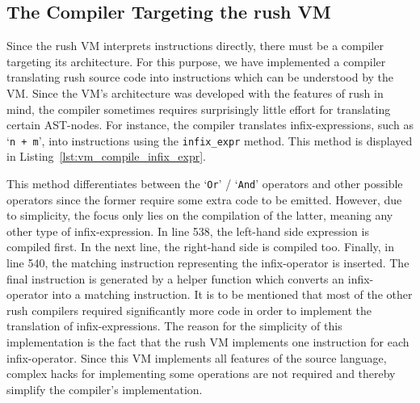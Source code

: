 \subsection{The Compiler Targeting the rush VM}

Since the rush VM interprets instructions directly, there must be a compiler targeting its architecture.
For this purpose, we have implemented a compiler translating rush source code into instructions which can be understood by the VM\@.
Since the VM's architecture was developed with the features of rush in mind,
the compiler sometimes requires surprisingly little effort for translating certain AST-nodes.
For instance, the compiler translates infix-expressions, such as `\texttt{n + m}', into instructions using the \texttt{infix\_expr} method.
This method is displayed in Listing~\ref{lst:vm_compile_infix_expr}.


This method differentiates between the `\texttt{Or}' / `\texttt{And}' operators and other possible operators since the former require some extra code to be emitted.
However, due to simplicity, the focus only lies on the compilation of the latter, meaning any other type of infix-expression.
In line 538, the left-hand side expression is compiled first.
In the next line, the right-hand side is compiled too.
Finally, in line 540, the matching instruction representing the infix-operator is inserted.
The final instruction is generated by a helper function which converts an infix-operator into a matching instruction.
It is to be mentioned that most of the other rush compilers required significantly more code in order to implement the translation of infix-expressions.
The reason for the simplicity of this implementation is the fact that the rush VM implements one instruction for each infix-operator.
Since this VM implements all features of the source language, complex hacks for implementing some operations are not required and thereby simplify the compiler's implementation.


